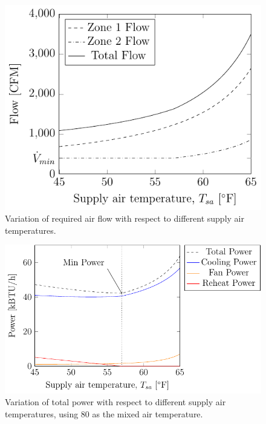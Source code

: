 \begin{figure}
\centering
\includegraphics{Plots/33-SimplifiedExampleFlow/simplifiedExampleFlow.pdf}
\caption{Variation of required air flow with respect to different supply
air temperatures.}
\label{fig:simplifiedExampleFlow}
\end{figure}

\newcommand{\variationCaption}[1]{Variation of total #1 with respect to
different supply air temperatures, using \SI{80}{\degreeF} as the mixed
air temperature. }

\begin{figure}
\centering
\includegraphics{Plots/32-SimplifiedExample/simplifiedExample.pdf}
\caption{\variationCaption{power}}
\label{fig:simplifiedExamplePower}
\end{figure}

